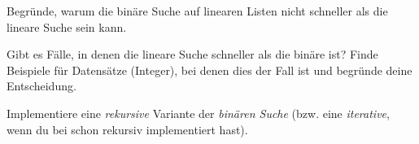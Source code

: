 \documentclass[11pt, a4paper, ngerman]{arbeitsblatt}
\begin{document}
\begin{aufgabe}[icon=\iconHeft]
	\label{aufg:effizienz}
	\begin{enuma}
		\item Begründe, warum die binäre Suche auf linearen Listen nicht schneller als die
		      lineare Suche  sein kann.
		\item Gibt es Fälle, in denen die lineare Suche schneller als die binäre ist? Finde
		      Beispiele für Datensätze (Integer), bei denen dies der Fall ist und begründe
		      deine Entscheidung.
	\end{enuma}
\end{aufgabe}

\begin{aufgabe*}[icon=\iconLaptop]
	\label{aufg:rekursiv}
	Implementiere eine \emph{rekursive} Variante der \emph{binären Suche} (bzw. eine
	\emph{iterative}, wenn du bei  schon rekursiv implementiert hast).
\end{aufgabe*}
\end{document}
